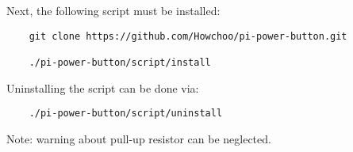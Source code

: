 Next, the following script must be installed:

\begin{verbatim}
	git clone https://github.com/Howchoo/pi-power-button.git
	
	./pi-power-button/script/install
\end{verbatim}

Uninstalling the script can be done via:

\begin{verbatim}
	./pi-power-button/script/uninstall
\end{verbatim}

Note: warning about pull-up resistor can be neglected.